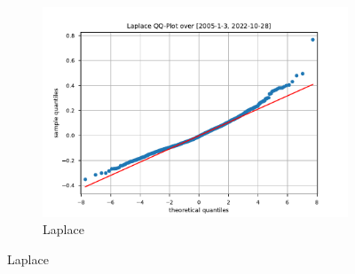 \begin{figure}[htbp]
\begin{subfigure}[b]{0.32\textwidth}
        \includegraphics[width=\textwidth]{content/reschap4/Figures/laplace_QQ_2005-1-3-2022-10-28.pdf}
        \caption{\small Laplace}
    \end{subfigure}


\end{figure}
